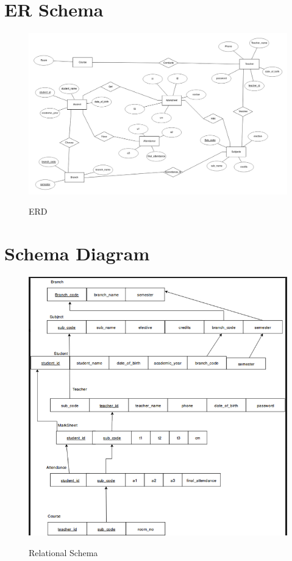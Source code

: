 \thispagestyle{fancy}

\section{ER Schema}
\begin{figure}[H]
\centering
\caption{ERD}
\includegraphics[scale=.35]{./erd.png}
\\[0.2in]
\label{fig:ER diagram}
\end{figure}

\pagebreak
\thispagestyle{fancy}

\section{Schema Diagram}
\begin{figure}[H]
\centering
\caption{Relational Schema}
\includegraphics[scale=.5]{./rs.png}
\\[0.2in]
\label{fig:Relational Schema}
\end{figure}

\thispagestyle{fancy}